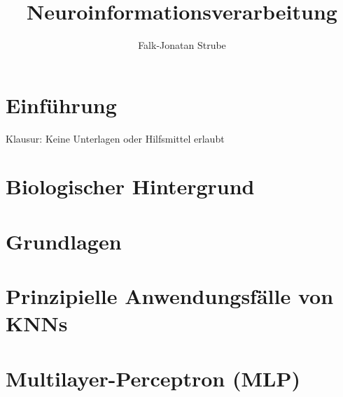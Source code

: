 \documentclass{scrreprt}
\title{Neuroinformations\-verarbeitung}
\author{Falk-Jonatan Strube}
\begin{document}
\maketitle
\tableofcontents

\chapter*{Einführung}
Klausur: Keine Unterlagen oder Hilfsmittel erlaubt

\chapter{Biologischer Hintergrund}


\chapter{Grundlagen}


\chapter{Prinzipielle Anwendungsfälle von KNNs}




\chapter{Multilayer-Perceptron (MLP)}

\end{document}
